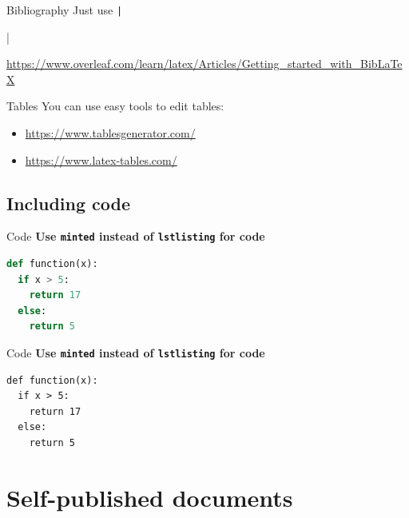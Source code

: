 \documentclass[aspectratio=169]{beamer}
\begin{document}
	\begin{frame}[fragile]{Bibliography}
		\centering
		\large
		Just use \texttt|\usepackage[backend=biber]{biblatex}|
		\vspace{1cm}
		
		\tiny
		\centering
		\url{https://www.overleaf.com/learn/latex/Articles/Getting_started_with_BibLaTeX}
	\end{frame}

	\begin{frame}{Tables}
		\centering
		You can use easy tools to edit tables:
		\begin{itemize}
			\item \url{https://www.tablesgenerator.com/}
			\item \url{https://www.latex-tables.com/}
		\end{itemize}
	\end{frame}

	\subsection{Including code}
	
	\begin{frame}[fragile]{Code}
\textbf{Use \texttt{minted} instead of \texttt{lstlisting} for code}

\vfill
{}
\begin{lstlisting}[language=Python]
def function(x):
  if x > 5:
    return 17
  else:
    return 5
\end{lstlisting}

	\end{frame}

	\begin{frame}[fragile]{Code}
	\textbf{Use \texttt{minted} instead of \texttt{lstlisting} for code}
	
	\vfill
\begin{verbatim}
def function(x):
  if x > 5:
    return 17
  else:
    return 5
\end{verbatim}


	
\end{frame}
	

  
	\section{Self-published documents}
	
\end{document}
